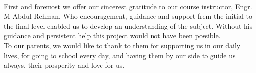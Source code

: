 


\begin{titlepage}
\begin{center}
 \\
\end{center}
  \vspace*{0.5cm}

First and foremost we offer our sincerest gratitude to our course instructor,  Engr. M Abdul Rehman, Who encouragement, guidance and support from the initial to the final level enabled us to develop an understanding of the subject. Without his guidance and persistent help this project would not have been possible.\\[0.2cm]
To our parents, we would like to thank to them for supporting us in our daily lives, for going to school every day, and having them by our side to guide us always, their prosperity and love for us.
\end{titlepage}


